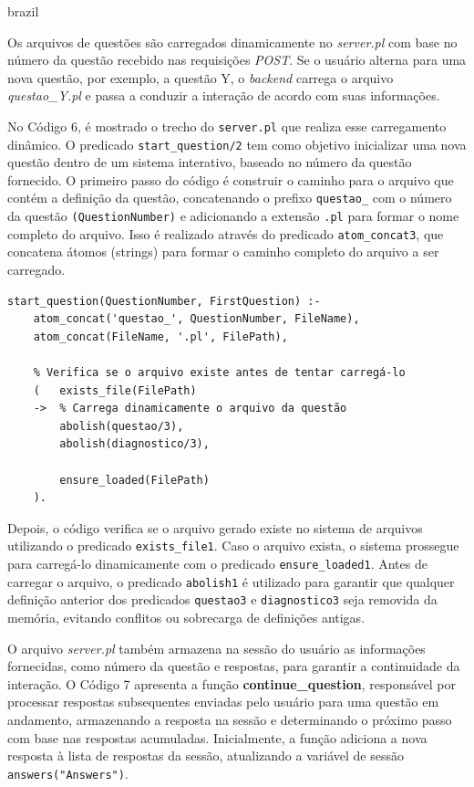 \begin{otherlanguage*}{brazil}

Os arquivos de questões são carregados dinamicamente no \textit{server.pl} com base no número da questão recebido nas requisições \textit{POST}. Se o usuário alterna para uma nova questão, por exemplo, a questão Y, o \textit{backend} carrega o arquivo \textit{questao\_Y.pl} e passa a conduzir a interação de acordo com suas informações. 

No Código 6, é mostrado o trecho do \texttt{server.pl} que realiza esse carregamento dinâmico. O predicado \texttt{start\_question/2} tem como objetivo inicializar uma nova questão dentro de um sistema interativo, baseado no número da questão fornecido. O primeiro passo do código é construir o caminho para o arquivo que contém a definição da questão, concatenando o prefixo \texttt{questao\_} com o número da questão \texttt{(QuestionNumber)} e adicionando a extensão \texttt{.pl} para formar o nome completo do arquivo. Isso é realizado através do predicado \texttt{atom\_concat\/3}, que concatena átomos (strings) para formar o caminho completo do arquivo a ser carregado.

\begin{lstlisting}[style=ufscthesisx_style, caption={Arquivo \textit{server.pl} - \textit{Handlers} e Manipuladores de requisições}]
start_question(QuestionNumber, FirstQuestion) :-
    atom_concat('questao_', QuestionNumber, FileName),
    atom_concat(FileName, '.pl', FilePath),

    % Verifica se o arquivo existe antes de tentar carregá-lo
    (   exists_file(FilePath)
    ->  % Carrega dinamicamente o arquivo da questão
        abolish(questao/3),
        abolish(diagnostico/3),

        ensure_loaded(FilePath)
    ).
\end{lstlisting}

Depois, o código verifica se o arquivo gerado existe no sistema de arquivos utilizando o predicado \texttt{exists\_file\/1}. Caso o arquivo exista, o sistema prossegue para carregá-lo dinamicamente com o predicado \texttt{ensure\_loaded\/1}. Antes de carregar o arquivo, o predicado \texttt{abolish\/1} é utilizado para garantir que qualquer definição anterior dos predicados \texttt{questao\/3} e \texttt{diagnostico\/3} seja removida da memória, evitando conflitos ou sobrecarga de definições antigas.


O arquivo \textit{server.pl} também armazena na sessão do usuário as informações fornecidas, como número da questão e respostas, para garantir a continuidade da interação. O Código 7 apresenta a função \textbf{continue\_question}, responsável por processar respostas subsequentes enviadas pelo usuário para uma questão em andamento, armazenando a resposta na sessão e determinando o próximo passo com base nas respostas acumuladas. Inicialmente, a função adiciona a nova resposta à lista de respostas da sessão, atualizando a variável de sessão \texttt{answers("Answers")}. 


\end{otherlanguage*}
